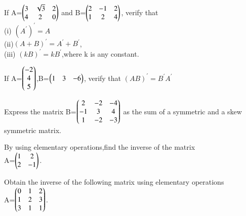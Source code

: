 \item If A=$\begin{pmatrix}3 &\sqrt{3} &2\\4 &2 &0\end{pmatrix}$ and B=$\begin{pmatrix}2 &-1 &2\\1 &2 &4\end{pmatrix}$, verify that\\
(i) $(A^{'})^{'}=A$\\ (ii)$(A+B)^{'}=A^{'}+B^{'}$,\\ (iii) $(kB)^{'}=kB^{'}$,where k is any constant.\\
\item If A=$\begin{pmatrix}-2\\4 \\5\end{pmatrix}$,B=$\begin{pmatrix}1 &3 &-6\end{pmatrix}$, verify that $(AB)^{'}=B^{'}A^{'}$\\
\item Express the matrix B=$\begin{pmatrix}2 &-2 &-4\\-1 &3 &4\\1 &-2 &-3\end{pmatrix}$ as the sum of a symmetric and a skew symmetric matrix.\\
\solution
  
  
\item By using elementary operations,find the inverse of the matrix\\
A=$\begin{pmatrix}1 &2\\2 &-1\end{pmatrix}$.\\
\item Obtain the inverse of the following matrix using elementary operations\\
A=$\begin{pmatrix}0 &1 &2\\1 &2 &3\\3 &1 &1\end{pmatrix}$.\\
\solution
  


